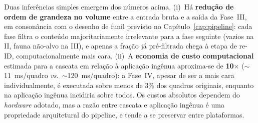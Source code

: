 Duas inferências simples emergem dos números acima. (i)~Há \textbf{redução de ordem de grandeza no volume} entre a entrada bruta e a saída da Fase~III, em consonância com o desenho de funil previsto no Capítulo~\ref{cap:pipeline}: cada fase filtra o conteúdo majoritariamente irrelevante para a fase seguinte (vazios na II, fauna não-alvo na III), e apenas a fração já pré-filtrada chega à etapa de re-ID, computacionalmente mais cara. (ii)~A \textbf{economia de custo computacional} estimada para a cascata em relação à aplicação ingênua aproxima-se de \textbf{10}$\times$ ($\sim$11~ms/quadro \emph{vs.}\ $\sim$120~ms/quadro): a Fase~IV, apesar de ser a mais cara individualmente, é executada sobre menos de 3\% dos quadros originais, enquanto na aplicação ingênua incidiria sobre todos. Os custos absolutos dependem do \emph{hardware} adotado, mas a razão entre cascata e aplicação ingênua é uma propriedade arquitetural do pipeline, e tende a se preservar entre plataformas.



